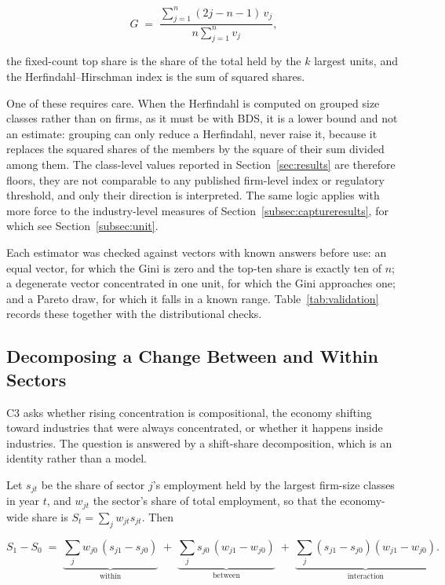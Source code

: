 \documentclass[jrfm,article,submit,pdftex,moreauthors]{Definitions/mdpi}
\begin{document}
\begin{equation}
G \;=\; \frac{\sum_{j=1}^{n} (2j - n - 1)\, v_j}{n \sum_{j=1}^{n} v_j},
\label{eq:gini}
\end{equation}

the fixed-count top share is the share of the total held by the $k$ largest units, and the
Herfindahl--Hirschman index is the sum of squared shares.

One of these requires care. When the Herfindahl is computed on grouped size classes rather
than on firms, as it must be with BDS, it is a lower bound and not an estimate: grouping can
only reduce a Herfindahl, never raise it, because it replaces the squared shares of the
members by the square of their sum divided among them. The class-level values reported in
Section~\ref{sec:results} are therefore floors, they are not comparable to any published
firm-level index or regulatory threshold, and only their direction is interpreted. The same
logic applies with more force to the industry-level measures of
Section~\ref{subsec:captureresults}, for which see Section~\ref{subsec:unit}.

Each estimator was checked against vectors with known answers before use: an equal vector,
for which the Gini is zero and the top-ten share is exactly ten of $n$; a degenerate vector
concentrated in one unit, for which the Gini approaches one; and a Pareto draw, for which it
falls in a known range. Table~\ref{tab:validation} records these together with the
distributional checks.



\subsection{Decomposing a Change Between and Within Sectors}
\label{subsec:shiftshare}

C3 asks whether rising concentration is compositional, the economy shifting toward
industries that were always concentrated, or whether it happens inside industries. The
question is answered by a shift-share decomposition, which is an identity rather than a
model.

Let $s_{jt}$ be the share of sector $j$'s employment held by the largest firm-size classes in
year $t$, and $w_{jt}$ the sector's share of total employment, so that the economy-wide
share is $S_t = \sum_j w_{jt} s_{jt}$. Then

\begin{equation}
S_1 - S_0 \;=\; \underbrace{\sum_j w_{j0}\,(s_{j1} - s_{j0})}_{\text{within}}
\;+\; \underbrace{\sum_j s_{j0}\,(w_{j1} - w_{j0})}_{\text{between}}
\;+\; \underbrace{\sum_j (s_{j1} - s_{j0})(w_{j1} - w_{j0})}_{\text{interaction}} .
\label{eq:shiftshare}
\end{equation}
\end{document}
